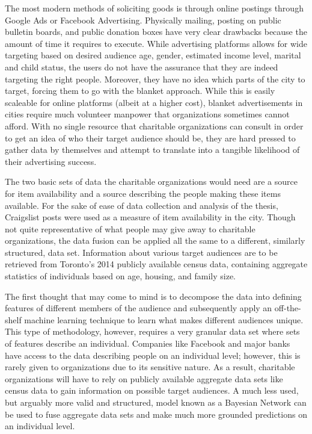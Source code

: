 \documentclass[12pt]{article}
\begin{document}
The most modern methods of soliciting goods is through online postings through Google Ads or Facebook Advertising. Physically mailing, posting on public bulletin boards, and public donation boxes have very clear drawbacks because the amount of time it requires to execute. While advertising platforms allows for wide targeting based on desired audience age, gender, estimated income level, marital and child status, the users do not have the assurance that they are indeed targeting the right people. Moreover, they have no idea which parts of the city to target, forcing them to go with the blanket approach. While this is easily scaleable for online platforms (albeit at a higher cost), blanket advertisements in cities require much volunteer manpower that organizations sometimes cannot afford. With no single resource that charitable organizations can consult in order to get an idea of who their target audience should be, they are hard pressed to gather data by themselves and attempt to translate into a tangible likelihood of their advertising success. 

The two basic sets of data the charitable organizations would need are a source for item availability and a source describing the people making these items available. For the sake of ease of data collection and analysis of the thesis, Craigslist posts were used as a measure of item availability in the city. Though not quite representative of what people may give away to charitable organizations, the data fusion can be applied all the same to a different, similarly structured, data set. Information about various target audiences are to be retrieved from Toronto's 2014 publicly available census data, containing aggregate statistics of individuals based on age, housing, and family size. 

The first thought that may come to mind is to decompose the data into defining features of different members of the audience and subsequently apply an off-the-shelf machine learning technique to learn what makes different audiences unique. This type of methodology, however, requires a very granular data set where sets of features describe an individual. Companies like Facebook and major banks have access to the data describing people on an individual level; however, this is rarely given to organizations due to its sensitive nature. As a result, charitable organizations will have to rely on publicly available aggregate data sets like census data to gain information on possible target audiences. A much less used, but arguably more valid and structured, model known as a Bayesian Network can be used to fuse aggregate data sets and make much more grounded predictions on an individual level.
\end{document}
